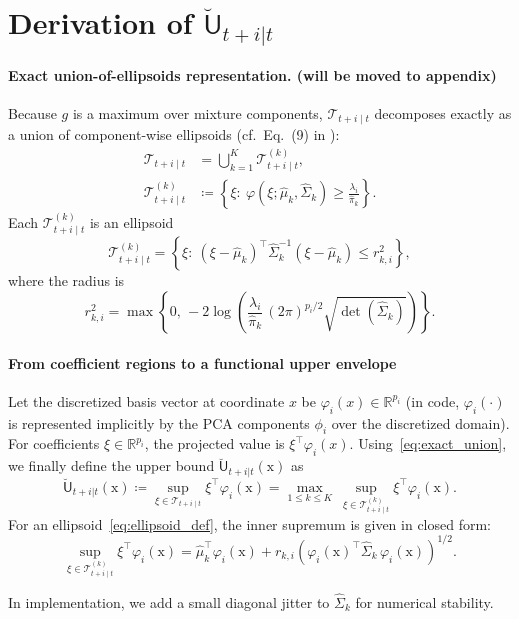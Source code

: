 \documentclass[lettersize,journal]{IEEEtran}
\begin{document}
{\appendices

\section*{Derivation of $\breve{\mathsf{U}}_{t+i|t}$}\label{app:derivation}
\paragraph{Exact union-of-ellipsoids representation.{\color{teal} (will be moved to appendix)}}
Because $g$ is a maximum over mixture components,
$\mathscr{T}_{t+i\mid t}$ decomposes exactly as a union of component-wise ellipsoids
(cf.\ Eq.\ (9) in \cite{lei2015conformal}):
\begin{equation}
\begin{aligned}
\mathscr{T}_{t+i\mid t} &= \bigcup_{k=1}^K \mathscr{T}^{(k)}_{t+i\mid t}, \\
\mathscr{T}^{(k)}_{t+i\mid t} &\coloneqq \left\{\xi:\ \varphi(\xi;\widehat\mu_k,\widehat\Sigma_k)\ge \tfrac{\lambda_i}{\widehat\pi_k}\right\}.
\end{aligned}
\label{eq:exact_union}
\end{equation}
Each $\mathscr{T}^{(k)}_{t+i\mid t}$ is an ellipsoid
\begin{equation}
\mathscr{T}^{(k)}_{t+i\mid t}
=
\left\{\xi:\ (\xi-\widehat\mu_k)^\top \widehat\Sigma_k^{-1}(\xi-\widehat\mu_k)\le r_{k,i}^2\right\},
\label{eq:ellipsoid_def}
\end{equation}
where the radius is
\begin{equation*}
r_{k,i}^2
=
\max\!\left\{
0,\,
-2\log\!\left(
\frac{\lambda_i}{\widehat\pi_k}\,(2\pi)^{p_i/2}\sqrt{\det(\widehat\Sigma_k)}
\right)
\right\}.
\end{equation*}


\paragraph{From coefficient regions to a functional upper envelope}
\label{sec:upper_envelope}

Let the discretized basis vector at coordinate $x$ be
$\varphi_i(x)\in\mathbb{R}^{p_i}$ (in code, $\varphi_i(\cdot)$ is represented implicitly
by the PCA components $\phi_i$ over the discretized domain).
For coefficients $\xi\in\mathbb{R}^{p_i}$, the projected value is $\xi^\top \varphi_i(x)$.
Using~\eqref{eq:exact_union}, we finally define the upper bound $\breve{\mathsf{U}}_{t+i|t}(\mathrm{x})$ as
\begin{equation*}
\breve{\mathsf{U}}_{t+i|t}(\mathrm{x}) \coloneqq \sup_{\xi\in\mathscr{T}_{t+i\mid t}} \xi^\top \varphi_i(\mathrm{x})
=
\max_{1\le k\le K}\ \sup_{\xi\in\mathscr{T}^{(k)}_{t+i\mid t}} \xi^\top \varphi_i(\mathrm{x}).
\end{equation*}
For an ellipsoid~\eqref{eq:ellipsoid_def}, the inner supremum  is given in closed form:
\begin{equation}
\sup_{\xi\in\mathscr{T}^{(k)}_{t+i\mid t}} \xi^\top \varphi_i(\mathrm{x})
=
\widehat\mu_k^\top \varphi_i(\mathrm{x})
+
r_{k,i}\left(\varphi_i(\mathrm{x})^\top \widehat\Sigma_k\, \varphi_i(\mathrm{x})\right)^{1/2}.
\label{eq:ellipsoid_support_function}
\end{equation}

In implementation, we add a small diagonal jitter to $\widehat\Sigma_k$
for numerical stability.



}



\end{document}
